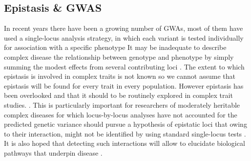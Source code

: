 

\subsection{Epistasis \& GWAS}

In recent years there have been a growing number of GWAs, most of them have used a single-locus analysis strategy, in which each variant is tested individually for association with a specific phenotype \cite{cordell2009detecting}
It may be inadequate to describe complex disease the relationship between genotype and phenotype by simply summing the modest effects from several contributing loci \cite{culverhouse2002perspective}.
The extent to which epistasis is involved in complex traits is not known so we cannot assume that epistasis will be found for every trait in every population. \cite{carlborg2004epistasis}
However epistasis has been overlooked and that it should to be routinely explored in complex trait studies.  \cite{carlborg2004epistasis}.
This is particularly important for researchers of moderately heritable complex diseases for which locus-by-locus analyses have not accounted for the predicted genetic variance should pursue a hypothesis of epistatic loci \cite{culverhouse2002perspective} that owing to their interaction, might not be identified by using standard single-locus tests \cite{cordell2009detecting}.
It is also hoped that detecting such interactions will allow to elucidate biological pathways that underpin disease \cite{cordell2009detecting}.

